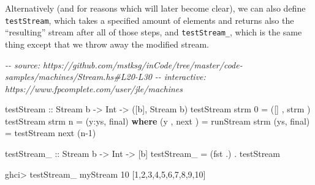 \documentclass[]{article}
\newenvironment{Shaded}{}{}
\newcommand{\CommentTok}[1]{\textcolor[rgb]{0.38,0.63,0.69}{\textit{#1}}}
\newcommand{\DataTypeTok}[1]{\textcolor[rgb]{0.56,0.13,0.00}{#1}}
\newcommand{\DecValTok}[1]{\textcolor[rgb]{0.25,0.63,0.44}{#1}}
\newcommand{\FunctionTok}[1]{\textcolor[rgb]{0.02,0.16,0.49}{#1}}
\newcommand{\KeywordTok}[1]{\textcolor[rgb]{0.00,0.44,0.13}{\textbf{#1}}}
\newcommand{\NormalTok}[1]{#1}
\newcommand{\OperatorTok}[1]{\textcolor[rgb]{0.40,0.40,0.40}{#1}}
\newcommand{\OtherTok}[1]{\textcolor[rgb]{0.00,0.44,0.13}{#1}}
\begin{document}
\begin{Shaded}
\end{Shaded}

Alternatively (and for reasons which will later become clear), we can also
define \texttt{testStream}, which takes a specified amount of elements and
returns also the ``resulting'' stream after all of those steps, and
\texttt{testStream\_}, which is the same thing except that we throw away the
modified stream.

\begin{Shaded}
\begin{Highlighting}[]
\CommentTok{{-}{-} source: https://github.com/mstksg/inCode/tree/master/code{-}samples/machines/Stream.hs\#L20{-}L30}
\CommentTok{{-}{-} interactive: https://www.fpcomplete.com/user/jle/machines}

\OtherTok{testStream ::} \DataTypeTok{Stream}\NormalTok{ b }\OtherTok{{-}\textgreater{}} \DataTypeTok{Int} \OtherTok{{-}\textgreater{}}\NormalTok{ ([b], }\DataTypeTok{Stream}\NormalTok{ b)}
\NormalTok{testStream strm }\DecValTok{0} \OtherTok{=}\NormalTok{ ([]  , strm )}
\NormalTok{testStream strm n }\OtherTok{=}\NormalTok{ (y}\OperatorTok{:}\NormalTok{ys, final)}
  \KeywordTok{where}
\NormalTok{    (y , next )   }\OtherTok{=}\NormalTok{ runStream  strm}
\NormalTok{    (ys, final)   }\OtherTok{=}\NormalTok{ testStream next (n}\OperatorTok{{-}}\DecValTok{1}\NormalTok{)}

\OtherTok{testStream\_ ::} \DataTypeTok{Stream}\NormalTok{ b }\OtherTok{{-}\textgreater{}} \DataTypeTok{Int} \OtherTok{{-}\textgreater{}}\NormalTok{ [b]}
\NormalTok{testStream\_ }\OtherTok{=}\NormalTok{ (}\FunctionTok{fst} \OperatorTok{.}\NormalTok{) }\OperatorTok{.}\NormalTok{ testStream}
\end{Highlighting}
\end{Shaded}

\begin{Shaded}
\begin{Highlighting}[]
\NormalTok{ghci}\OperatorTok{\textgreater{}}\NormalTok{ testStream\_ myStream }\DecValTok{10}
\NormalTok{[}\DecValTok{1}\NormalTok{,}\DecValTok{2}\NormalTok{,}\DecValTok{3}\NormalTok{,}\DecValTok{4}\NormalTok{,}\DecValTok{5}\NormalTok{,}\DecValTok{6}\NormalTok{,}\DecValTok{7}\NormalTok{,}\DecValTok{8}\NormalTok{,}\DecValTok{9}\NormalTok{,}\DecValTok{10}\NormalTok{]}
\end{Highlighting}
\end{Shaded}
\end{document}
